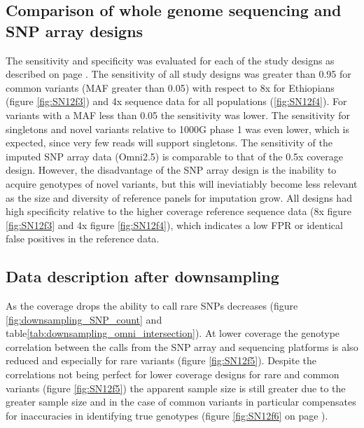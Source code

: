 \subsection{Comparison of whole genome sequencing and SNP array designs}
\label{subsec:result_downsampling_sensspec}
The sensitivity and specificity was evaluated for each of the study designs as described on page \pageref{subsec:sensspec}. The sensitivity of all study designs was greater than 0.95 for common variants (\gls{MAF} greater than 0.05) with respect to 8x for Ethiopians (figure \ref{fig:SN12f3}) and 4x sequence data for all populations (\ref{fig:SN12f4}). For variants with a \gls{MAF} less than 0.05 the sensitivity was lower. The sensitivity for singletons and novel variants relative to 1000G phase 1 was even lower, which is expected, since very few reads will support singletons. The sensitivity of the imputed SNP array data (Omni2.5) is comparable to that of the 0.5x coverage design. However, the disadvantage of the \gls{SNP} array design is the inability to acquire genotypes of novel variants, but this will ineviatiably become less relevant as the size and diversity of reference panels for imputation grow. All designs had high specificity relative to the higher coverage reference sequence data (8x figure \ref{fig:SN12f3} and 4x figure \ref{fig:SN12f4}), which indicates a low \gls{FPR} or identical false positives in the reference data.





\subsection{Data description after downsampling}
\label{subsec:result_downsampling}

As the coverage drops the ability to call rare \glspl{SNP} decreases (figure \ref{fig:downsampling_SNP_count} and table\ref{tab:downsampling_omni_intersection}). At lower coverage the genotype correlation between the calls from the SNP array and sequencing platforms is also reduced and especially for rare variants (figure \ref{fig:SN12f5}). Despite the correlations not being perfect for lower coverage designs for rare and common variants (figure \ref{fig:SN12f5}) the apparent sample size is still greater due to the greater sample size and in the case of common variants in particular compensates for inaccuracies in identifying true genotypes (figure \ref{fig:SN12f6} on page \pageref{subsec:result_apparent}).






